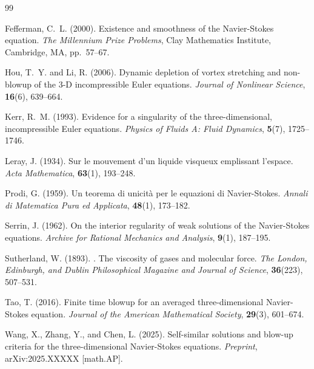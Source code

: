 \documentclass[12pt]{article}
\begin{document}
\begin{thebibliography}{99}

Fefferman, C.~L. (2000).
\newblock Existence and smoothness of the Navier-Stokes equation.
\newblock \emph{The Millennium Prize Problems}, Clay Mathematics Institute,
  Cambridge, MA, pp.~57--67.

Hou, T.~Y. and Li, R. (2006).
\newblock Dynamic depletion of vortex stretching and non-blowup of the
  3-D incompressible Euler equations.
\newblock \emph{Journal of Nonlinear Science}, \textbf{16}(6), 639--664.

Kerr, R.~M. (1993).
\newblock Evidence for a singularity of the three-dimensional, incompressible
  Euler equations.
\newblock \emph{Physics of Fluids A: Fluid Dynamics}, \textbf{5}(7),
  1725--1746.

Leray, J. (1934).
\newblock Sur le mouvement d'un liquide visqueux emplissant l'espace.
\newblock \emph{Acta Mathematica}, \textbf{63}(1), 193--248.

Prodi, G. (1959).
\newblock Un teorema di unicit\`a per le equazioni di Navier-Stokes.
\newblock \emph{Annali di Matematica Pura ed Applicata}, \textbf{48}(1),
  173--182.

Serrin, J. (1962).
\newblock On the interior regularity of weak solutions of the Navier-Stokes
  equations.
\newblock \emph{Archive for Rational Mechanics and Analysis}, \textbf{9}(1),
  187--195.

Sutherland, W. (1893).
. The viscosity of gases and molecular force.
\newblock \emph{The London, Edinburgh, and Dublin Philosophical Magazine and
  Journal of Science}, \textbf{36}(223), 507--531.

Tao, T. (2016).
\newblock Finite time blowup for an averaged three-dimensional Navier-Stokes
  equation.
\newblock \emph{Journal of the American Mathematical Society}, \textbf{29}(3),
  601--674.

Wang, X., Zhang, Y., and Chen, L. (2025).
\newblock Self-similar solutions and blow-up criteria for the
  three-dimensional Navier-Stokes equations.
\newblock \emph{Preprint}, arXiv:2025.XXXXX [math.AP].

\end{thebibliography}
\end{document}
